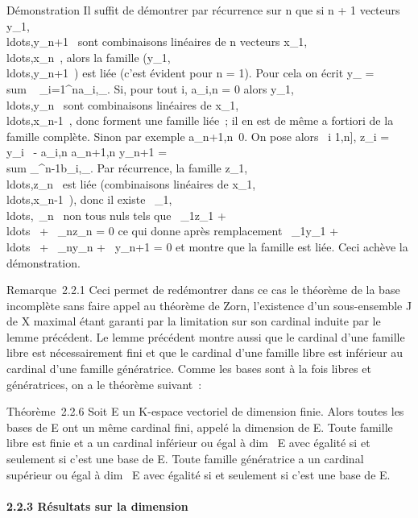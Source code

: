 \documentclass[]{article}
\begin{document}
Démonstration Il suffit de démontrer par récurrence sur n que si n + 1
vecteurs
y\_1,\\ldots,y\_n+1~
sont combinaisons linéaires de n vecteurs
x\_1,\\ldots,x\_n~,
alors la famille
(y\_1,\\ldots,y\_n+1~)
est liée (c'est évident pour n = 1). Pour cela on écrit y\_\jmath
= \\sum ~
\_i=1^na\_i,\jmathx\_\jmath. Si, pour tout i,
a\_i,n = 0 alors
y\_1,\\ldots,y\_n~
sont combinaisons linéaires de
x\_1,\\ldots,x\_n-1~,
donc forment une famille liée~; il en est de même a fortiori de la
famille complète. Sinon par exemple
a\_n+1,n\neq~0. On pose alors
\forall~i \in {[}1,n{]}, z\_i = y\_i~
- a\_i,n \over a\_n+1,n
y\_n+1 =\ \\sum
 \_^n-1b\_i,\jmathx\_\jmath. Par récurrence,
la famille
z\_1,\\ldots,z\_n~
est liée (combinaisons linéaires de
x\_1,\\ldots,x\_n-1~),
donc il existe
\alpha~\_1,\\ldots,\alpha~\_n~
non tous nuls tels que \alpha~\_1z\_1 +
\\ldots~ +
\alpha~\_nz\_n = 0 ce qui donne après remplacement
\alpha~\_1y\_1 +
\\ldots~ +
\alpha~\_ny\_n + \beta~y\_n+1 = 0 et montre que la famille
est liée. Ceci achève la démonstration.

Remarque~2.2.1 Ceci permet de redémontrer dans ce cas le théorème de la
base incomplète sans faire appel au théorème de Zorn, l'existence d'un
sous-ensemble J de X maximal étant garanti par la limitation sur son
cardinal induite par le lemme précédent. Le lemme précédent montre aussi
que le cardinal d'une famille libre est nécessairement fini et que le
cardinal d'une famille libre est inférieur au cardinal d'une famille
génératrice. Comme les bases sont à la fois libres et génératrices, on a
le théorème suivant~:

Théorème~2.2.6 Soit E un K-espace vectoriel de dimension finie. Alors
toutes les bases de E ont un même cardinal fini, appelé la dimension de
E. Toute famille libre est finie et a un cardinal inférieur ou égal à
dim~ E avec égalité si et seulement si c'est
une base de E. Toute famille génératrice a un cardinal supérieur ou égal
à dim~ E avec égalité si et seulement si c'est
une base de E.

\paragraph{2.2.3 Résultats sur la dimension}
\end{document}
